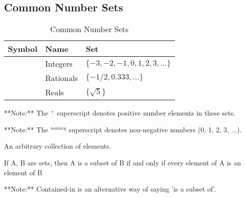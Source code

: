 \documentclass[11pt]{article}
\begin{document}
\newpage
\subsection{Common Number Sets}

\begin{table}[!htbp]
    \centering
    \begin{tabular}{ c l l }
        \toprule
        Symbol  & Name      & Set \\
        \midrule
        \Z      & Integers  & $\{-3,-2,-1,0,1,2,3, ... \}$ \\
        \Q      & Rationals & $\{ -1/2, 0.333, ... \}$ \\
        \R      & Reals     & $\{ \sqrt{5} \}$ \\
        \bottomrule
    \end{tabular}
    \label{tab:tbl-number-sets}
    \caption{Common Number Sets}
\end{table}

\starON
**Note:** The $^+$ superscript denotes positive number elements in these sets. 

**Note:** The $^{nonneg}$ superscript denotes non-negative numbers (0, 1, 2, 3, ...). 
\starOFF

\begin{definition}[Set]\label{def:set}
An arbitrary collection of elements.
\end{definition}

\begin{definition}[Subset]\label{def:subset-txt}
If A, B are sets, then A is a subset of B if and only if every element of A is an element of B
\end{definition}



\starON
**Note:** Contained-in is an alternative way of saying 'is a subset of'.
\starOFF
\end{document}
